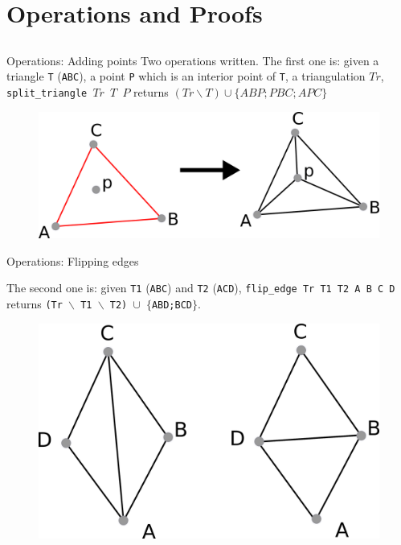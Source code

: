 \documentclass[18pt]{beamer}
\begin{document}
\section{Operations and Proofs}
\subsection*{}
\begin{frame}{Operations: Adding points}
Two operations written. The first one is: given a triangle {\tt T} ({\tt ABC}), a point {\tt P} which is an interior point of {\tt T}, a triangulation $Tr$, {\tt split\_triangle $Tr$ $T$ $P$} returns $(Tr \smallsetminus T) \cup \{ABP;PBC;APC\}$

\begin{figure} 
  \centering
  \includegraphics[scale=1.2]{split_triangle}
\end{figure}
  \end{frame}
  
  
  \begin{frame}{Operations: Flipping edges}
  
   The second one is: given {\tt T1} ({\tt ABC}) and {\tt T2} ({\tt ACD}), {\tt flip\_edge Tr T1 T2 A B C D} returns {\tt (Tr $\smallsetminus$ T1 $\smallsetminus$ T2) $\cup$ $\{$ABD;BCD$\}$}.
   

 \begin{figure}
  \centering
  \includegraphics[scale=0.8]{flip_edge}

\end{figure}

\end{frame}
\end{document}
